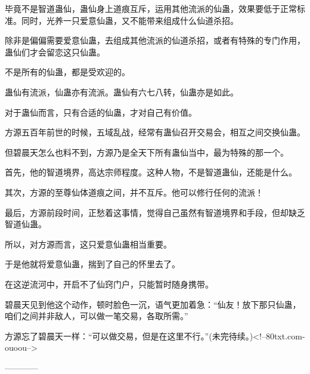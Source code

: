 \begin{this_body}
毕竟不是智道蛊仙，蛊仙身上道痕互斥，运用其他流派的仙蛊，效果要低于正常标准。同时，光养一只爱意仙蛊，又不能带来组成什么仙道杀招。

除非是偏偏需要爱意仙蛊，去组成其他流派的仙道杀招，或者有特殊的专门作用，蛊仙们才会留恋这只仙蛊。

不是所有的仙蛊，都是受欢迎的。

蛊仙有流派，仙蛊亦有流派。蛊仙有六七八转，仙蛊亦是如此。

对于蛊仙而言，只有合适的仙蛊，才对自己有价值。

方源五百年前世的时候，五域乱战，经常有蛊仙召开交易会，相互之间交换仙蛊。

但碧晨天怎么也料不到，方源乃是全天下所有蛊仙当中，最为特殊的那一个。

首先，他的智道境界，高达宗师程度。这种人物，不是智道蛊仙，还能是什么。

其次，方源的至尊仙体道痕之间，并不互斥。他可以修行任何的流派！

最后，方源前段时间，正愁着这事情，觉得自己虽然有智道境界和手段，但却缺乏智道仙蛊。

所以，对方源而言，这只爱意仙蛊相当重要。

于是他就将爱意仙蛊，揣到了自己的怀里去了。

在这逆流河中，开启不了仙窍门户，只能暂时随身携带。

碧晨天见到他这个动作，顿时脸色一沉，语气更加着急：“仙友！放下那只仙蛊，咱们之间并非敌人，可以做一笔交易，各取所需。”

方源忘了碧晨天一样：“可以做交易，但是在这里不行。”(未完待续。)<!--80txt.com-ouoou-->

------------

\end{this_body}

